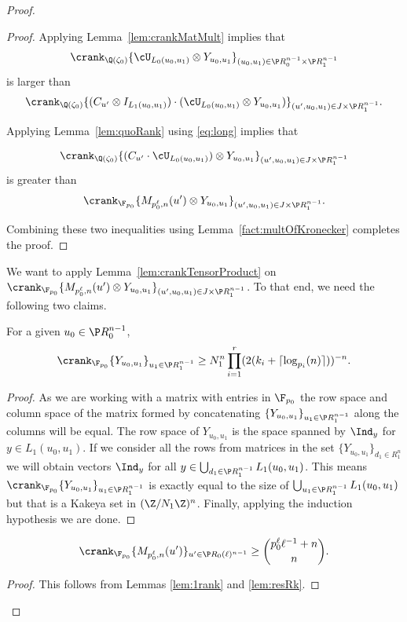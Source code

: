 \begin{proof}
\begin{proof}
Applying Lemma~\ref{lem:crankMatMult} implies that
$$\crank_{\Q(\zeta_0)} \{\cU_{L_{0}(u_0,u_1)}\otimes Y_{u_0,u_1}\}_{(u_0,u_1)\in \P R_0^{n-1}\times \P R_1^{n-1}}$$
is larger than 
$$\crank_{\Q(\zeta_0)} \{(C_{u'}\otimes I_{L_1(u_0,u_1)})\cdot (\cU_{L_{0}(u_0,u_1)}\otimes Y_{u_0,u_1})\}_{(u',u_0,u_1)\in J\times \P R_1^{n-1}}.$$

Applying Lemma~\ref{lem:quoRank} using \eqref{eq:long} implies that 

$$\crank_{\Q(\zeta_0)} \{(C_{u'}\cdot \cU_{L_{0}(u_0,u_1)})\otimes Y_{u_0,u_1}\}_{(u',u_0,u_1)\in J\times \P R_1^{n-1}} $$
is greater than
$$\crank_{\F_{p_0}} \{M_{p_0^{\ell},n}(u')\otimes Y_{u_0,u_1}\}_{(u',u_0,u_1)\in J\times \P R_1^{n-1}}. $$

Combining these two inequalities using Lemma~\ref{fact:multOfKronecker} completes the proof.
\end{proof}

We want to apply Lemma~\ref{lem:crankTensorProduct} on $\crank_{\F_{p_0}} \{M_{p_0^{\ell},n}(u')\otimes Y_{u_0,u_1}\}_{(u',u_0,u_1)\in J\times \P R_1^{n-1}}$. To that end, we need the following two claims.

\begin{claim}
For a given $u_0 \in \P R_0^{n-1}$,
{\em $$\crank_{\F_{p_0}} \{Y_{u_0,u_1}\}_{u_1\in \P R_1^{n-1}} \ge N_1^n\prod\limits_{i=1}^r (2(k_i+\lceil \log_{p_i}(n)\rceil))^{-n}.$$}
\end{claim}
\begin{proof}
As we are working with a matrix with entries in $\F_{p_0}$ the row space and column space of the matrix formed by concatenating $\{Y_{u_0,u_1}\}_{u_1\in \P R_1^{n-1}}$ along the columns will be equal. The row space of $Y_{u_0,u_1}$ is the space spanned by $\Ind_y$ for $y\in L_1(u_0,u_1)$. If we consider all the rows from matrices in the set $\{Y_{u_0,u_1}\}_{d_1\in R_1^n}$ we will obtain vectors $\Ind_y$ for all $y \in \bigcup_{d_1\in  \P R_1^{n-1}} L_1(u_0,u_1)$. 
This means $\crank_{\F_{p_0}} \{Y_{u_0,u_1}\}_{u_1\in \P R_1^{n-1}}$ is exactly equal to the size of $\bigcup_{u_1\in \P R_1^{n-1}} L_1(u_0,u_1)$ but that is a Kakeya set in $(\Z/N_1\Z)^n$. Finally, applying the induction hypothesis we are done.
\end{proof}

\begin{claim}
{\em$$\crank_{\F_{p_0}} \{M_{p_0^{\ell},n}(u')\}_{u'\in \P R_0(\ell)^{n-1}} \ge \binom{p_0^\ell \ell^{-1}+n}{n}.$$}
\end{claim}
\begin{proof}
This follows from Lemmas \ref{lem:1rank} and \ref{lem:resRk}.
\end{proof}


\end{proof}
